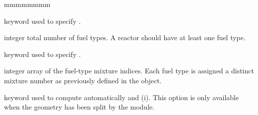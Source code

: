 \begin{ListeDeDescription}{mmmmmmmm}
\item[\moc{NFUEL}] keyword used to specify .

\item[\dusa{nfuel}] integer total number of fuel types.
A reactor should have at least one fuel type.

\item[\moc{FMIX}] keyword used to specify .

\item[\dusa{mixf}] integer array of the fuel-type mixture indices.
Each fuel type is assigned a distinct mixture number as
previously defined in the  object.

\item[\moc{ASBLY}] keyword used to compute automatically  and (i). This option is only available when the geometry has been split by the  module.

\end{ListeDeDescription}
\clearpage
